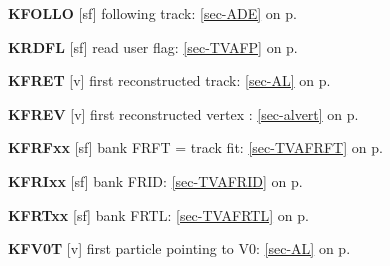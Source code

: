  \item{\bf KFOLLO  }[sf] following track: \ref{sec-ADE} on p.~\pageref{sec-ADE}\\
 \item{\bf KRDFL   }[sf] read user flag: \ref{sec-TVAFP} on p.~\pageref{sec-TVAFP}\\
 \item{\bf KFRET   }[v] first reconstructed track: \ref{sec-AL} on p.~\pageref{sec-AL}\\
 \item{\bf KFREV   }[v] first reconstructed vertex  : \ref{sec-alvert} on p.~\pageref{sec-alvert}\\
 \item{\bf KFRFxx  }[sf] bank FRFT = track fit: \ref{sec-TVAFRFT} on p.~\pageref{sec-TVAFRFT}\\
 \item{\bf KFRIxx  }[sf] bank FRID: \ref{sec-TVAFRID} on p.~\pageref{sec-TVAFRID}\\
 \item{\bf KFRTxx  }[sf] bank FRTL: \ref{sec-TVAFRTL} on p.~\pageref{sec-TVAFRTL}\\
 \item{\bf KFV0T   }[v] first particle pointing to V0: \ref{sec-AL} on p.~\pageref{sec-AL}
 
